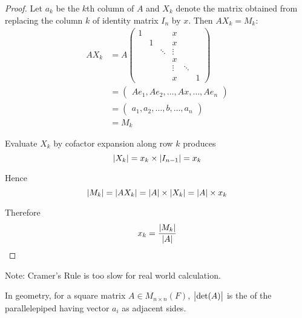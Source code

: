 \begin{proof}
	Let $a_k$ be the $k$th column of $A$ and $X_k$ denote the matrix obtained from replacing the column $k$ of identity matrix $I_n$ by $x$. Then $A X_k = M_k$:
	\begin{equation*}
	\begin{aligned}
        A X_k &= A \begin{pmatrix}
			1 &   &   & x &   \\
			 & 1 &  & x &   \\
			 && \ddots &  \vdots \\
			&&& x & \\
			&&& \vdots & \ddots \\
			&&& x&   & 1 
		\end{pmatrix} \\
		&= \begin{pmatrix}
		    Ae_1, Ae_2, \dots, Ax, \dots, Ae_n
		\end{pmatrix} \\
		& = \begin{pmatrix}
		    a_1, a_2, \dots, b, \dots, a_n
		\end{pmatrix} \\
		&= M_k
		\end{aligned}
    \end{equation*}
	
	
	Evaluate $X_k$ by cofactor expansion along row $k$ produces
	\begin{equation*}
		\displaystyle \left| \displaystyle X_k \right| = x_k \times \displaystyle \left| \displaystyle I_{n-1} \right| = x_k
	\end{equation*}
	
	Hence 
	\begin{equation*}
		\displaystyle \left| \displaystyle M_k \right| = \displaystyle \left| \displaystyle A X_k \right| = \displaystyle \left| \displaystyle A \right| \times \displaystyle \left| \displaystyle X_k \right| = \displaystyle \left| \displaystyle A \right| \times x_k
	\end{equation*}
	
	Therefore
	\begin{equation*}
		x_k = \frac{\displaystyle \left| \displaystyle M_k \right|}{\displaystyle \left| \displaystyle A \right|}
	\end{equation*}
\end{proof}

Note: Cramer's Rule is too slow for real world calculation.

\begin{theorem}
	In geometry, for a square matrix $A \in M_{n\times n}(F)$, $\displaystyle \left\lvert \text{det}(A) \right\rvert$ is the  of the parallelepiped having vector $a_i$ as adjacent sides.
\end{theorem}


